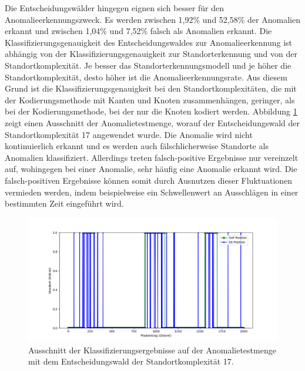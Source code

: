 \newpage
Die Entscheidungswälder hingegen eignen sich besser für den Anomalieerkennungszweck.
Es werden zwischen 1,92\% und 52,58\% der Anomalien erkannt und zwischen 1,04\% und 7,52\% falsch als Anomalien erkannt.
Die Klassifizierungsgenauigkeit des Entscheidungswaldes zur Anomalieerkennung ist abhängig von der Klassifizierungsgenauigkeit zur Standorterkennung
und von der Standortkomplexität.
Je besser das Standorterkennungsmodell und je höher die Standortkomplexität, desto höher ist die Anomalieerkennungsrate.
Aus diesem Grund ist die Klassifizierungsgenauigkeit bei den Standortkomplexitäten, die mit der Kodierungsmethode mit Kanten und Knoten zusammenhängen,
geringer, als bei der Kodierungsmethode, bei der nur die Knoten kodiert werden.
\newline
\newline
Abbildung \ref{fig:true_vs_predicted_anomaly} zeigt einen Ausschnitt der Anomalietestmenge, worauf der Entscheidungswald der Standortkomplexität 17 angewendet wurde.
Die Anomalie wird nicht kontinuierlich erkannt und es werden auch fälschlicherweise Standorte als Anomalien klassifiziert.
Allerdings treten falsch-positive Ergebnisse nur vereinzelt auf, wohingegen bei einer Anomalie, sehr häufig eine Anomalie erkannt wird.
Die falsch-positiven Ergebnisse können somit durch Ausnutzen dieser Fluktuationen vermieden werden,
indem beispielweise ein Schwellenwert an Ausschlägen in einer bestimmten Zeit eingeführt wird.
\begin{figure}[h!]
    \centering
    \includegraphics[width=\linewidth]{images/anomaly_true_vs_predicted.png}
    \caption{Ausschnitt der Klassifizierungsergebnisse auf der Anomalietestmenge mit dem Entscheidungswald der Standortkomplexität 17. }
    \label{fig:true_vs_predicted_anomaly}
\end{figure}